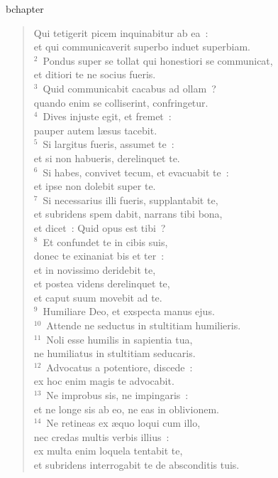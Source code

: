 bchapter\begin{verse}\vspace{-19pt}Qui tetigerit picem inquinabitur ab ea~:\\ et qui communicaverit superbo induet superbiam.\\
${}^{2}$~Pondus super se tollat qui honestiori se communicat,\\ et ditiori te ne socius fueris.\\
${}^{3}$~Quid communicabit cacabus ad ollam~?\\ quando enim se colliserint, confringetur.\\
${}^{4}$~Dives injuste egit, et fremet~:\\ pauper autem l\ae sus tacebit.\\
${}^{5}$~Si largitus fueris, assumet te~:\\ et si non habueris, derelinquet te.\\
${}^{6}$~Si habes, convivet tecum, et evacuabit te~:\\ et ipse non dolebit super te.\\
${}^{7}$~Si necessarius illi fueris, supplantabit te,\\ et subridens spem dabit, narrans tibi bona,\\ et dicet~: Quid opus est tibi~?\\
${}^{8}$~Et confundet te in cibis suis,\\ donec te exinaniat bis et ter~:\\ et in novissimo deridebit te,\\ et postea videns derelinquet te,\\ et caput suum movebit ad te.\\
${}^{9}$~Humiliare Deo, et exspecta manus ejus.\\
${}^{10}$~Attende ne seductus in stultitiam humilieris.\\
${}^{11}$~Noli esse humilis in sapientia tua,\\ ne humiliatus in stultitiam seducaris.\\
${}^{12}$~Advocatus a potentiore, discede~:\\ ex hoc enim magis te advocabit.\\
${}^{13}$~Ne improbus sis, ne impingaris~:\\ et ne longe sis ab eo, ne eas in oblivionem.\\
${}^{14}$~Ne retineas ex \ae quo loqui cum illo,\\ nec credas multis verbis illius~:\\ ex multa enim loquela tentabit te,\\ et subridens interrogabit te de absconditis tuis.\\

\end{verse}
